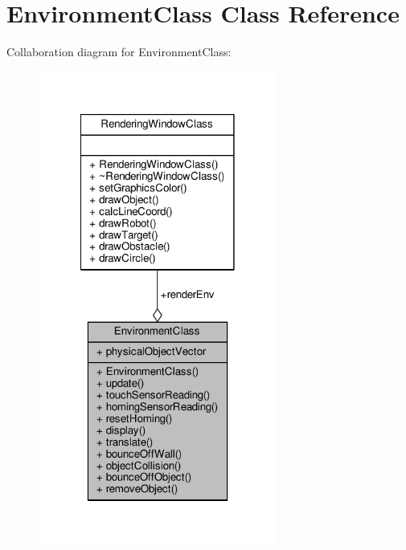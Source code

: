 \hypertarget{classEnvironmentClass}{\section{Environment\-Class Class Reference}
\label{classEnvironmentClass}
}


Collaboration diagram for Environment\-Class\-:
\nopagebreak
\begin{figure}[H]
\begin{center}
\leavevmode
\includegraphics[width=222pt]{classEnvironmentClass__coll__graph}
\end{center}
\end{figure}
